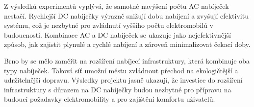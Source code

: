 \documentclass[a4paper,11pt]{article}
\begin{document}
Z výsledků experimentů vyplývá, že samotné navýšení počtu AC nabíječek nestačí. Rychlejší DC nabíječky výrazně snižují dobu nabíjení a zvyšují efektivitu systému, což je nezbytné pro zvládnutí vyššího počtu elektromobilů v budoucnosti. Kombinace AC a DC nabíječek se ukazuje jako nejefektivnější způsob, jak zajistit plynulé a rychlé nabíjení a zároveň minimalizovat čekací doby.

Brno by se mělo zaměřit na rozšíření nabíjecí infrastruktury, která kombinuje oba typy nabíječek. Taková síť umožní městu zvládnout přechod na ekologičtější a udržitelnější dopravu. Výsledky projektu jasně ukazují, že investice do rozšíření infrastruktury s důrazem na DC nabíječky budou nezbytné pro přípravu na budoucí požadavky elektromobility a pro zajištění komfortu uživatelů.

\newpage


\label{sec:zdroje}
\end{document}
